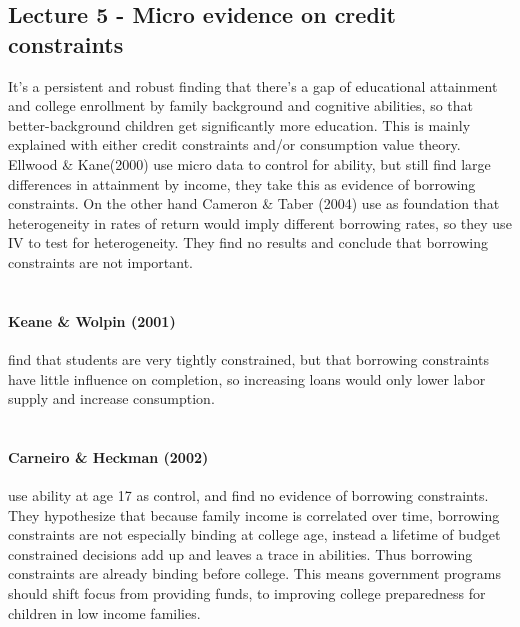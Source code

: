 \documentclass[12pt, a4paper]{article}
\begin{document}
\begin{multicols}{2}
\subsection{Lecture 5 - Micro evidence on credit constraints}
It's a persistent and robust finding that there's a gap of educational attainment and college enrollment by family background and cognitive abilities, so that better-background children get significantly more education. This is mainly explained with either credit constraints and/or consumption value theory. Ellwood \& Kane(2000) use micro data to control for ability, but still find large differences in attainment by income, they take this as evidence of borrowing constraints. On the other hand Cameron \& Taber (2004) use as foundation that heterogeneity in rates of return would imply different borrowing rates, so they use IV to test for heterogeneity. They find no results and conclude that borrowing constraints are not important. 
\\ \\
\paragraph{Keane \& Wolpin (2001)} find that students are very tightly constrained, but that borrowing constraints have little influence on completion, so increasing loans would only lower labor supply and increase consumption. 
\\ \\
\paragraph{Carneiro \& Heckman (2002)} use ability at age 17 as control, and find no evidence of borrowing constraints. They hypothesize that because family income is correlated over time, borrowing constraints are not especially binding at college age, instead a lifetime of budget constrained decisions add up and leaves a trace in abilities. Thus borrowing constraints are already binding before college.   
This means government programs should shift focus from providing funds, to improving college preparedness for children in low income families. 
\\ \\

\end{multicols}
\end{document}
